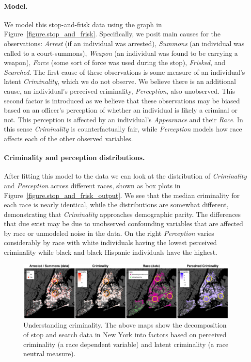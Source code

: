 \paragraph{Model.}
We model this stop-and-frisk data using the graph in
Figure~\ref{figure.stop_and_frisk}. Specifically, we posit main causes
for the observations: \emph{Arrest} (if an individual was arrested),
\emph{Summons} (an individual was called to a court-summons),
\emph{Weapon} (an individual was found to be carrying a weapon),
\emph{Force} (some sort of force was used during the stop),
\emph{Frisked}, and \emph{Searched}. The first cause of these
observations is some measure of an individual's latent
\emph{Criminality}, which we do not observe. We believe there is an
additional cause, an individual's perceived criminality,
\emph{Perception}, also unobserved. This second factor is introduced
as we believe that these observations may be biased based on an
officer's perception of whether an individual is likely a criminal or
not. This perception is affected by an individual's \emph{Appearance}
and their \emph{Race}. In this sense \emph{Criminality} is
counterfactually fair, while \emph{Perception} models how race affects
each of the other observed variables.

\paragraph{Criminality and perception distributions.}
After fitting this model to the data we can look at the distribution
of \emph{Criminality} and \emph{Perception} across different races,
shown as box plots in Figure~\ref{figure.stop_and_frisk_output}. We see that
the median criminality for each race is nearly identical, while the
distributions are somewhat different, demonstrating that
\emph{Criminality} approaches demographic parity. The differences that
due exist may be due to unobserved confounding variables that are
affected by race or unmodeled noise in the data. On the right
\emph{Perception} varies considerably by race with white individuals
having the lowest perceived criminality while black and black Hispanic
individuals have the highest.

\begin{figure}[!t]
\begin{center}
\centerline{\includegraphics[width=\textwidth]{stop_and_frisk_graphs.png}}
\caption{Understanding criminality. The above maps show the
  decomposition of stop and search data in New York into factors based
  on perceived criminality (a race dependent variable) and latent
  criminality (a race neutral measure). \label{figure.criminality}}
\end{center}
\end{figure}

